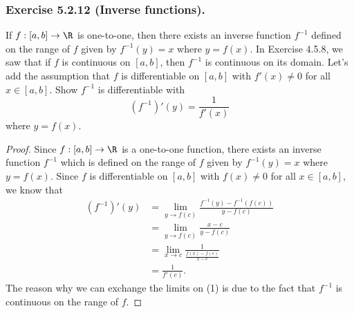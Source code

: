 \subsubsection{Exercise 5.2.12 (Inverse functions).} If \( f: [a,b] \to \R  \) is one-to-one, then there exists an inverse function \( f^{-1}  \) defined on the range of \( f  \) given by \( f^{-1}(y) = x  \) where \( y = f(x)  \). In Exercise 4.5.8, we saw that if \( f  \) is continuous on \( [a,b]  \), then \( f^{-1}  \) is continuous on its domain. Let's add the assumption that \( f  \) is differentiable on \( [a,b]  \) with \( f'(x) \neq 0  \) for all \( x \in [a,b]  \). Show \( f^{-1}  \) is differentiable with 
\[  (f^{-1})'(y) = \frac{ 1 }{ f'(x)  }  \] where \( y = f(x)  \).
\begin{proof}
    Since \( f: [a,b] \to \R   \) is a one-to-one function, there exists an inverse function \( f^{-1} \) which is defined on the range of \( f  \) given by \( f^{-1}(y) = x  \) where \( y = f(x)  \). Since \( f  \) is differentiable on \( [a,b]  \) with \( f(x) \neq 0  \) for all \( x \in [a,b] \), we know that 
    \begin{align*}
        (f^{-1})'(y) &= \lim_{ y  \to f(c)  } \frac{ f^{-1}(y) - f^{-1}(f(c)) }{ y - f(c)  }  \\
                     &= \lim_{ y \to f(c)  } \frac{ x - c  }{ y - f(c)  } \\
                     &= \lim_{ x \to c  } \frac{ 1 }{ \frac{ f(x) - f(c)  }{ x - c  }  } \tag{1} \\
                     &= \frac{ 1 }{ f'(c)  }.
    \end{align*}
    The reason why we can exchange the limits on (1) is due to the fact that \( f^{-1}  \) is continuous on the range of \( f  \).

\end{proof} 

